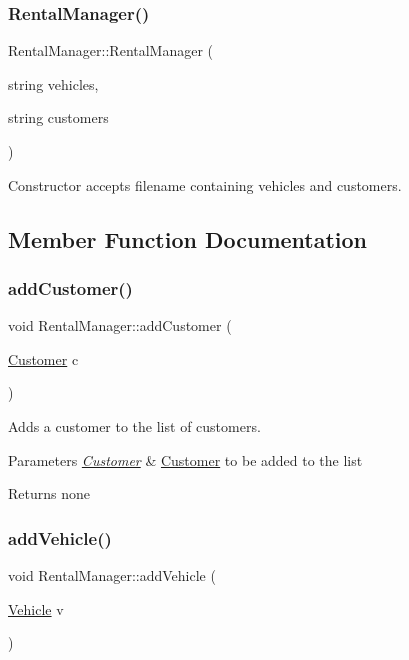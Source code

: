 \subsubsection{\texorpdfstring{Rental\+Manager()}{RentalManager()}\hspace{0.1cm}{\footnotesize\ttfamily [2/2]}}
{\footnotesize\ttfamily Rental\+Manager\+::\+Rental\+Manager (\begin{DoxyParamCaption}\item[{string}]{vehicles,  }\item[{string}]{customers }\end{DoxyParamCaption})}

Constructor accepts filename containing vehicles and customers. 

\subsection{Member Function Documentation}
\mbox{\label{class_rental_manager_a7f78be10cb46d3737775d6610c517d71}} 
\subsubsection{\texorpdfstring{add\+Customer()}{addCustomer()}}
{\footnotesize\ttfamily void Rental\+Manager\+::add\+Customer (\begin{DoxyParamCaption}\item[{\hyperlink{class_customer}{Customer}}]{c }\end{DoxyParamCaption})}

Adds a customer to the list of customers.


\begin{DoxyParams}{Parameters}
{\em \hyperlink{class_customer}{Customer}} & \hyperlink{class_customer}{Customer} to be added to the list \\
\hline
\end{DoxyParams}
\begin{DoxyReturn}{Returns}
none 
\end{DoxyReturn}
\mbox{\label{class_rental_manager_a4363860fad4cfdd5ab189667e2dfc3d4}} 
\subsubsection{\texorpdfstring{add\+Vehicle()}{addVehicle()}}
{\footnotesize\ttfamily void Rental\+Manager\+::add\+Vehicle (\begin{DoxyParamCaption}\item[{\hyperlink{class_vehicle}{Vehicle}}]{v }\end{DoxyParamCaption})}

